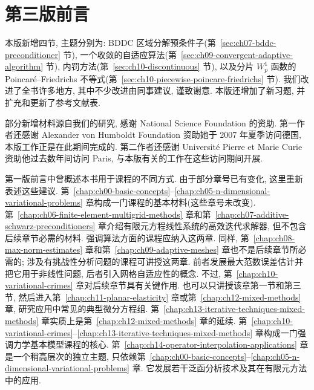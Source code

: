 
\hypersetup{pageanchor=false}

\hypersetup{pageanchor=true}

\clearpage
\section*{第三版前言}
\label{front:preface-third-edition}

本版新增四节, 主题分别为: BDDC 区域分解预条件子(第~\ref{sec:ch07-bddc-preconditioner} 节), 一个收敛的自适应算法(第~\ref{sec:ch09-convergent-adaptive-algorithm} 节), 内罚方法(第~\ref{sec:ch10-discontinuous} 节), 以及分片 $W_p^1$ 函数的 Poincaré--Friedrichs 不等式(第~\ref{sec:ch10-piecewise-poincare-friedrichs} 节). 我们改进了全书许多地方, 其中不少改进由同事建议, 谨致谢意. 本版还增加了新习题, 并扩充和更新了参考文献表.

部分新增材料源自我们的研究, 感谢 National Science Foundation 的资助. 第一作者还感谢 Alexander von Humboldt Foundation 资助她于 2007 年夏季访问德国, 本版工作正是在此期间完成的. 第二作者还感谢 Université Pierre et Marie Curie 资助他过去数年间访问 Paris, 与本版有关的工作在这些访问期间开展.

第一版前言中曾概述本书用于课程的不同方式. 由于部分章号已有变化, 这里重新表述这些建议. 第~\ref{chap:ch00-basic-concepts}--\ref{chap:ch05-n-dimensional-variational-problems} 章构成一门课程的基本材料(这些章号未改变). 第~\ref{chap:ch06-finite-element-multigrid-methods} 章和第~\ref{chap:ch07-additive-schwarz-preconditioners} 章介绍有限元方程线性系统的高效迭代求解器, 但不包含后续章节必需的材料. 强调算法方面的课程应纳入这两章. 同样, 第~\ref{chap:ch08-max-norm-estimates} 章和第~\ref{chap:ch09-adaptive-meshes} 章也不是后续章节所必需的; 涉及有挑战性分析问题的课程可讲授这两章. 前者发展最大范数误差估计并把它用于非线性问题, 后者引入网格自适应性的概念. 不过, 第~\ref{chap:ch10-variational-crimes} 章对后续章节具有关键作用. 也可以只讲授该章第一节和第三节, 然后进入第~\ref{chap:ch11-planar-elasticity} 章或第~\ref{chap:ch12-mixed-methods} 章, 研究应用中常见的典型微分方程组. 第~\ref{chap:ch13-iterative-techniques-mixed-methods} 章实质上是第~\ref{chap:ch12-mixed-methods} 章的延续. 第~\ref{chap:ch10-variational-crimes}--\ref{chap:ch13-iterative-techniques-mixed-methods} 章构成一门强调力学基本模型课程的核心. 第~\ref{chap:ch14-operator-interpolation-applications} 章是一个稍高层次的独立主题, 只依赖第~\ref{chap:ch00-basic-concepts}--\ref{chap:ch05-n-dimensional-variational-problems} 章. 它发展若干泛函分析技术及其在有限元方法中的应用.

